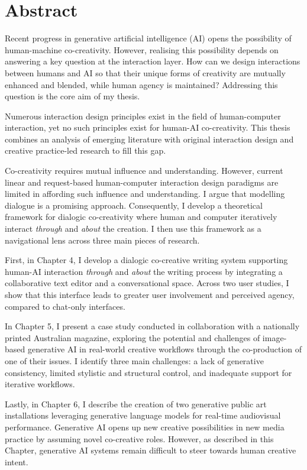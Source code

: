 \chapter{Abstract}

Recent progress in generative artificial intelligence (AI) opens the possibility of human-machine co-creativity. However, realising this possibility depends on answering a key question at the interaction layer. How can we design interactions between humans and AI so that their unique forms of creativity are mutually enhanced and blended, while human agency is maintained? Addressing this question is the core aim of my thesis. 

Numerous interaction design principles exist in the field of human-computer interaction, yet no such principles exist for human-AI co-creativity. This thesis combines an analysis of emerging literature with original interaction design and creative practice-led research to fill this gap. 

Co-creativity requires mutual influence and understanding. However, current linear and request-based human-computer interaction design paradigms are limited in affording such influence and understanding. I argue that modelling dialogue is a promising approach. Consequently, I develop a theoretical framework for dialogic co-creativity where human and computer iteratively interact \textit{through} and \textit{about} the creation. I then use this framework as a navigational lens across three main pieces of research.

First, in Chapter 4, I develop a dialogic co-creative writing system supporting human-AI interaction \textit{through} and \textit{about} the writing process by integrating a collaborative text editor and a conversational space. Across two user studies, I show that this interface leads to greater user involvement and perceived agency, compared to chat-only interfaces.

In Chapter 5, I present a case study conducted in collaboration with a nationally printed Australian magazine, exploring the potential and challenges of image-based generative AI in real-world creative workflows through the co-production of one of their issues. I identify three main challenges: a lack of generative consistency, limited stylistic and structural control, and inadequate support for iterative workflows.

Lastly, in Chapter 6, I describe the creation of two generative public art installations leveraging generative language models for real-time audiovisual performance. Generative AI opens up new creative possibilities in new media practice by assuming novel co-creative roles. However, as described in this Chapter, generative AI systems remain difficult to steer towards human creative intent.

